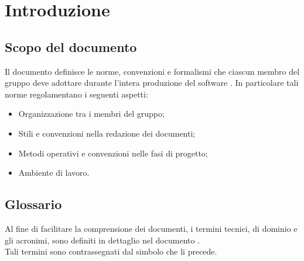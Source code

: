\section{Introduzione}

\subsection{Scopo del documento}

Il documento definisce le norme, convenzioni e formalismi  che ciascun membro del gruppo \gruppo{} deve adottare durante l'intera produzione del software \progetto{}.
In particolare tali norme regolamentano i seguenti aspetti:

\begin{itemize}
\item Organizzazione tra i membri del gruppo;
\item Stili e convenzioni nella redazione dei documenti;
\item Metodi operativi e convenzioni nelle fasi di progetto;
\item Ambiente di lavoro.
\end{itemize}

\subsection{Glossario}
Al fine di facilitare la comprensione dei documenti, i termini tecnici, di dominio e gli acronimi, sono definiti in dettaglio nel documento \Glossario{}.\\
Tali termini sono contrassegnati dal simbolo  che li precede.